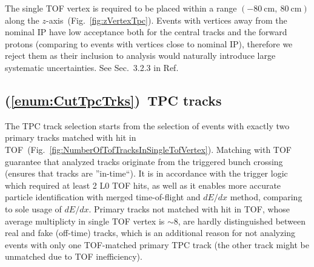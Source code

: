 The single TOF vertex is required to be placed within a range $(-80~\text{cm},~80~\text{cm})$ along the $z$-axis~(Fig.~\ref{fig:zVertexTpc}). Events with vertices away from the nominal IP have low acceptance both for the central tracks and the forward protons (comparing to events with vertices close to nominal IP), therefore we reject them as their inclusion to analysis would naturally introduce large systematic uncertainties. See Sec.~3.2.3 in Ref.~\cite{supplementaryNote}



















\subsection{(\ref{enum:CutTpcTrks})~TPC tracks}

The TPC track selection starts from the selection of events with exactly two primary tracks matched with hit in TOF~(Fig.~\ref{fig:NumberOfTofTracksInSingleTofVertex}). Matching with TOF guarantee that analyzed tracks originate from the triggered bunch crossing (ensures that tracks are ''in-time``). It is in accordance with the trigger logic which required at least 2 L0 TOF hits, as well as it enables more accurate particle identification with merged time-of-flight and $dE/dx$ method, comparing to sole usage of $dE/dx$. Primary tracks not matched with hit in TOF, whose average multiplicty in single TOF vertex is $\sim$8, are hardly distinguished between real and fake (off-time) tracks, which is an additional reason for not analyzing events with only one TOF-matched primary TPC track (the other track might be unmatched due to TOF inefficiency).

